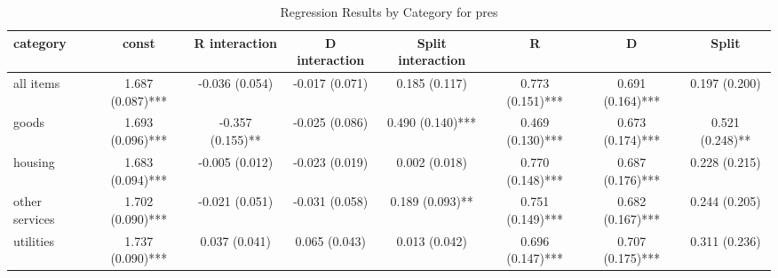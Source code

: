 \begin{table}[H]
\caption{Regression Results by Category for pres}
\label{tab:regression_results}
\begin{tabular}{lccccccc}
\toprule
category & const & R interaction & D interaction & Split interaction & R & D & Split \\
\midrule
all items & 1.687 (0.087)*** & -0.036 (0.054) & -0.017 (0.071) & 0.185 (0.117) & 0.773 (0.151)*** & 0.691 (0.164)*** & 0.197 (0.200) \\
goods & 1.693 (0.096)*** & -0.357 (0.155)** & -0.025 (0.086) & 0.490 (0.140)*** & 0.469 (0.130)*** & 0.673 (0.174)*** & 0.521 (0.248)** \\
housing & 1.683 (0.094)*** & -0.005 (0.012) & -0.023 (0.019) & 0.002 (0.018) & 0.770 (0.148)*** & 0.687 (0.176)*** & 0.228 (0.215) \\
other services & 1.702 (0.090)*** & -0.021 (0.051) & -0.031 (0.058) & 0.189 (0.093)** & 0.751 (0.149)*** & 0.682 (0.167)*** & 0.244 (0.205) \\
utilities & 1.737 (0.090)*** & 0.037 (0.041) & 0.065 (0.043) & 0.013 (0.042) & 0.696 (0.147)*** & 0.707 (0.175)*** & 0.311 (0.236) \\
\bottomrule
\end{tabular}
\end{table}
